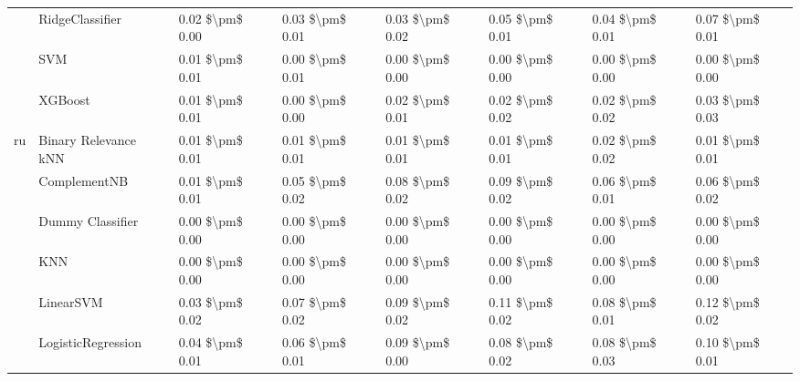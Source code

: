 \begin{tabular}{llllllll}
   & RidgeClassifier &  0.02 \$\textbackslash pm\$ 0.00 &           0.03 \$\textbackslash pm\$ 0.01 &       0.03 \$\textbackslash pm\$ 0.02 &        0.05 \$\textbackslash pm\$ 0.01 &                         0.04 \$\textbackslash pm\$ 0.01 &      0.07 \$\textbackslash pm\$ 0.01 \\
   & SVM &  0.01 \$\textbackslash pm\$ 0.01 &           0.00 \$\textbackslash pm\$ 0.01 &       0.00 \$\textbackslash pm\$ 0.00 &        0.00 \$\textbackslash pm\$ 0.00 &                         0.00 \$\textbackslash pm\$ 0.00 &      0.00 \$\textbackslash pm\$ 0.00 \\
   & XGBoost &  0.01 \$\textbackslash pm\$ 0.01 &           0.00 \$\textbackslash pm\$ 0.00 &       0.02 \$\textbackslash pm\$ 0.01 &        0.02 \$\textbackslash pm\$ 0.02 &                         0.02 \$\textbackslash pm\$ 0.02 &      0.03 \$\textbackslash pm\$ 0.03 \\
ru & Binary Relevance kNN &  0.01 \$\textbackslash pm\$ 0.01 &           0.01 \$\textbackslash pm\$ 0.01 &       0.01 \$\textbackslash pm\$ 0.01 &        0.01 \$\textbackslash pm\$ 0.01 &                         0.02 \$\textbackslash pm\$ 0.02 &      0.01 \$\textbackslash pm\$ 0.01 \\
   & ComplementNB &  0.01 \$\textbackslash pm\$ 0.01 &           0.05 \$\textbackslash pm\$ 0.02 &       0.08 \$\textbackslash pm\$ 0.02 &        0.09 \$\textbackslash pm\$ 0.02 &                         0.06 \$\textbackslash pm\$ 0.01 &      0.06 \$\textbackslash pm\$ 0.02 \\
   & Dummy Classifier &  0.00 \$\textbackslash pm\$ 0.00 &           0.00 \$\textbackslash pm\$ 0.00 &       0.00 \$\textbackslash pm\$ 0.00 &        0.00 \$\textbackslash pm\$ 0.00 &                         0.00 \$\textbackslash pm\$ 0.00 &      0.00 \$\textbackslash pm\$ 0.00 \\
   & KNN &  0.00 \$\textbackslash pm\$ 0.00 &           0.00 \$\textbackslash pm\$ 0.00 &       0.00 \$\textbackslash pm\$ 0.00 &        0.00 \$\textbackslash pm\$ 0.00 &                         0.00 \$\textbackslash pm\$ 0.00 &      0.00 \$\textbackslash pm\$ 0.00 \\
   & LinearSVM &  0.03 \$\textbackslash pm\$ 0.02 &           0.07 \$\textbackslash pm\$ 0.02 &       0.09 \$\textbackslash pm\$ 0.02 &        0.11 \$\textbackslash pm\$ 0.02 &                         0.08 \$\textbackslash pm\$ 0.01 &      0.12 \$\textbackslash pm\$ 0.02 \\
   & LogisticRegression &  0.04 \$\textbackslash pm\$ 0.01 &           0.06 \$\textbackslash pm\$ 0.01 &       0.09 \$\textbackslash pm\$ 0.00 &        0.08 \$\textbackslash pm\$ 0.02 &                         0.08 \$\textbackslash pm\$ 0.03 &      0.10 \$\textbackslash pm\$ 0.01 \\

\end{tabular}
